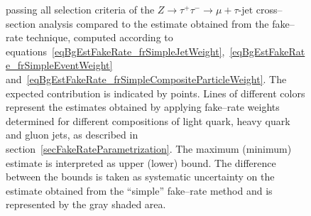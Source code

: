 \begin{figure}[t]
\begin{center}
{         passing all selection criteria 
         of the $Z \rightarrow \tau^{+} \tau^{-} \rightarrow \mu + \tau\mbox{-jet}$ cross--section analysis
	 compared to the estimate obtained from the fake--rate technique, 
         computed according to equations~\ref{eqBgEstFakeRate_frSimpleJetWeight},~\ref{eqBgEstFakeRate_frSimpleEventWeight} 
         and~\ref{eqBgEstFakeRate_frSimpleCompositeParticleWeight}.
	 The expected contribution is indicated by points.
	 Lines of different colors represent the estimates obtained by applying 
         fake--rate weights determined for different compositions of light quark, heavy quark and gluon jets,
         as described in section~\ref{secFakeRateParametrization}.
	 The maximum (minimum) estimate is interpreted as upper (lower) bound.
	 The difference between the bounds is taken as systematic uncertainty on the estimate 
         obtained from the ``simple'' fake--rate method and is represented by the gray shaded area.}
\label{figBgEstFakeRate_frSimpleResults_smBackgroundSum}
\end{center}
\end{figure} 

